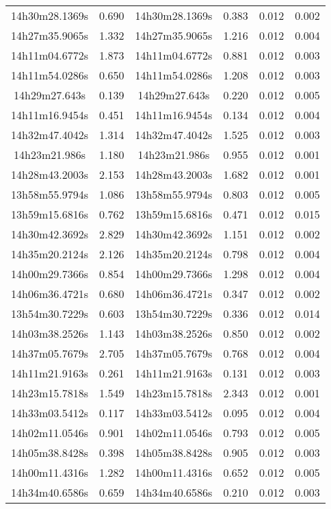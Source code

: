 \begin{table}
\begin{tabular}{cccccc}
14h30m28.1369s & 0.690 & 14h30m28.1369s & 0.383 & 0.012 & 0.002 \\
14h27m35.9065s & 1.332 & 14h27m35.9065s & 1.216 & 0.012 & 0.004 \\
14h11m04.6772s & 1.873 & 14h11m04.6772s & 0.881 & 0.012 & 0.003 \\
14h11m54.0286s & 0.650 & 14h11m54.0286s & 1.208 & 0.012 & 0.003 \\
14h29m27.643s & 0.139 & 14h29m27.643s & 0.220 & 0.012 & 0.005 \\
14h11m16.9454s & 0.451 & 14h11m16.9454s & 0.134 & 0.012 & 0.004 \\
14h32m47.4042s & 1.314 & 14h32m47.4042s & 1.525 & 0.012 & 0.003 \\
14h23m21.986s & 1.180 & 14h23m21.986s & 0.955 & 0.012 & 0.001 \\
14h28m43.2003s & 2.153 & 14h28m43.2003s & 1.682 & 0.012 & 0.001 \\
13h58m55.9794s & 1.086 & 13h58m55.9794s & 0.803 & 0.012 & 0.005 \\
13h59m15.6816s & 0.762 & 13h59m15.6816s & 0.471 & 0.012 & 0.015 \\
14h30m42.3692s & 2.829 & 14h30m42.3692s & 1.151 & 0.012 & 0.002 \\
14h35m20.2124s & 2.126 & 14h35m20.2124s & 0.798 & 0.012 & 0.004 \\
14h00m29.7366s & 0.854 & 14h00m29.7366s & 1.298 & 0.012 & 0.004 \\
14h06m36.4721s & 0.680 & 14h06m36.4721s & 0.347 & 0.012 & 0.002 \\
13h54m30.7229s & 0.603 & 13h54m30.7229s & 0.336 & 0.012 & 0.014 \\
14h03m38.2526s & 1.143 & 14h03m38.2526s & 0.850 & 0.012 & 0.002 \\
14h37m05.7679s & 2.705 & 14h37m05.7679s & 0.768 & 0.012 & 0.004 \\
14h11m21.9163s & 0.261 & 14h11m21.9163s & 0.131 & 0.012 & 0.003 \\
14h23m15.7818s & 1.549 & 14h23m15.7818s & 2.343 & 0.012 & 0.001 \\
14h33m03.5412s & 0.117 & 14h33m03.5412s & 0.095 & 0.012 & 0.004 \\
14h02m11.0546s & 0.901 & 14h02m11.0546s & 0.793 & 0.012 & 0.005 \\
14h05m38.8428s & 0.398 & 14h05m38.8428s & 0.905 & 0.012 & 0.003 \\
14h00m11.4316s & 1.282 & 14h00m11.4316s & 0.652 & 0.012 & 0.005 \\
14h34m40.6586s & 0.659 & 14h34m40.6586s & 0.210 & 0.012 & 0.003 \\

\end{tabular}
\end{table}

